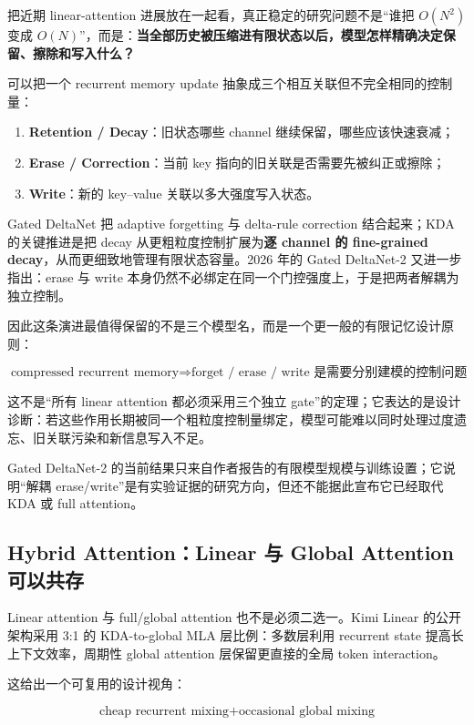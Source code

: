 \documentclass[profile=standard,twoside=false]{ipara-handbook}
\begin{document}
把近期 linear-attention 进展放在一起看，真正稳定的研究问题不是“谁把 $O(N^2)$ 变成 $O(N)$”，而是：\textbf{当全部历史被压缩进有限状态以后，模型怎样精确决定保留、擦除和写入什么？}

可以把一个 recurrent memory update 抽象成三个相互关联但不完全相同的控制量：

\begin{enumerate}
  \item \textbf{Retention / Decay}：旧状态哪些 channel 继续保留，哪些应该快速衰减；
  \item \textbf{Erase / Correction}：当前 key 指向的旧关联是否需要先被纠正或擦除；
  \item \textbf{Write}：新的 key--value 关联以多大强度写入状态。
\end{enumerate}

Gated DeltaNet 把 adaptive forgetting 与 delta-rule correction 结合起来；KDA 的关键推进是把 decay 从更粗粒度控制扩展为\textbf{逐 channel 的 fine-grained decay}，从而更细致地管理有限状态容量。2026 年的 Gated DeltaNet-2 又进一步指出：erase 与 write 本身仍然不必绑定在同一个门控强度上，于是把两者解耦为独立控制。

因此这条演进最值得保留的不是三个模型名，而是一个更一般的有限记忆设计原则：

$$
\boxed{
\text{compressed recurrent memory}
\Rightarrow
\text{forget / erase / write 是需要分别建模的控制问题}
}
$$

这不是“所有 linear attention 都必须采用三个独立 gate”的定理；它表达的是设计诊断：若这些作用长期被同一个粗粒度控制量绑定，模型可能难以同时处理过度遗忘、旧关联污染和新信息写入不足。

Gated DeltaNet-2 的当前结果只来自作者报告的有限模型规模与训练设置；它说明“解耦 erase/write”是有实验证据的研究方向，但还不能据此宣布它已经取代 KDA 或 full attention。

\subsection{Hybrid Attention：Linear 与 Global Attention 可以共存}

Linear attention 与 full/global attention 也不是必须二选一。Kimi Linear 的公开架构采用 3:1 的 KDA-to-global MLA 层比例：多数层利用 recurrent state 提高长上下文效率，周期性 global attention 层保留更直接的全局 token interaction。

这给出一个可复用的设计视角：

$$
\boxed{
\text{cheap recurrent mixing}
+\text{occasional global mixing}
}
$$
\end{document}
